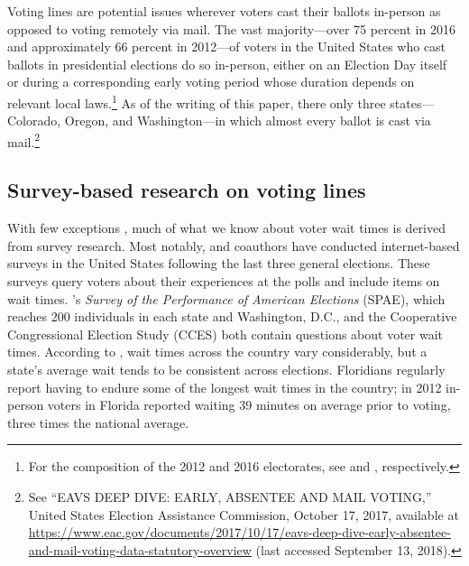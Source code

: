 \documentclass[12pt,titlepage]{article}
\begin{document}

Voting lines are potential issues wherever voters cast their ballots
in-person as opposed to voting remotely via mail.  The vast
majority---over 75 percent in 2016 and approximately 66 percent in
2012---of voters in the United States who cast ballots in presidential
elections do so in-person, either on an Election Day itself or during
a corresponding early voting period whose duration depends on relevant
local laws.\footnote{For the composition of the 2012 and 2016
  electorates, see \citet{eac:2012} and \citet{eac:2016},
  respectively.}  As of the writing of this paper, there only three
states---Colorado, Oregon, and Washington---in which almost every
ballot is cast via mail.\footnote{See ``EAVS DEEP DIVE: EARLY,
  ABSENTEE AND MAIL VOTING,'' United States Election Assistance
  Commission, October 17, 2017, available at
  \url{https://www.eac.gov/documents/2017/10/17/eavs-deep-dive-early-absentee-and-mail-voting-data-statutory-overview}
  (last accessed September 13, 2018).}


\subsection*{Survey-based research on voting lines}


With few exceptions \citep[e.g.,][]{spencermarkovits:renege,
  herronsmith:hanoverstudy, pettigrew:longlinesminorityprecincts},
much of what we know about voter wait times is derived from survey
research. Most notably, \citet{stewart:waitingtovote2012} and
coauthors have conducted internet-based surveys in the United States
following the last three general elections. These surveys query voters
about their experiences at the polls and include items on wait times.
\citeauthor{stewart:waitingtovote2012}'s \emph{Survey of the
  Performance of American Elections} (SPAE), which reaches 200
individuals in each state and Washington, D.C., and the Cooperative
Congressional Election Study (CCES) both contain questions about voter
wait times. According to \citeauthor{stewart:waitingtovote2012}, wait
times across the country vary considerably, but a state's average wait
tends to be consistent across elections. Floridians regularly report
having to endure some of the longest wait times in the country; in
2012 in-person voters in Florida reported waiting 39 minutes on
average prior to voting, three times the national average.
\end{document}
